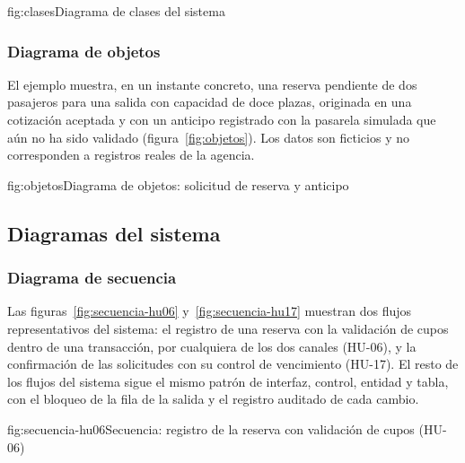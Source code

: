 \begin{landscape}
\thispagestyle{paisaje}
\begin{figuraapa}{fig:clases}{Diagrama de clases del sistema}
\end{figuraapa}
\end{landscape}

\subsubsection{Diagrama de objetos}

El ejemplo muestra, en un instante concreto, una reserva pendiente de dos
pasajeros para una salida con capacidad de doce plazas, originada en una
cotización aceptada y con un anticipo registrado con la pasarela simulada que
aún no ha sido validado (figura~\ref{fig:objetos}). Los datos son ficticios
y no corresponden a registros reales de la agencia.

\begin{landscape}
\thispagestyle{paisaje}
\begin{figuraapa}{fig:objetos}{Diagrama de objetos: solicitud de reserva y anticipo}
\end{figuraapa}
\end{landscape}

\subsection{Diagramas del sistema}

\subsubsection{Diagrama de secuencia}

Las figuras~\ref{fig:secuencia-hu06} y~\ref{fig:secuencia-hu17} muestran dos
flujos representativos del sistema: el registro de una reserva con la
validación de cupos dentro de una transacción, por cualquiera de los dos
canales (HU-06), y la confirmación de las solicitudes con su control de
vencimiento (HU-17). El resto de los flujos del sistema sigue el mismo patrón
de interfaz, control, entidad y tabla, con el bloqueo de la fila de la
salida y el registro auditado de cada cambio.

\begin{figuraapa}{fig:secuencia-hu06}{Secuencia: registro de la reserva con validación de cupos (HU-06)}
\end{figuraapa}

